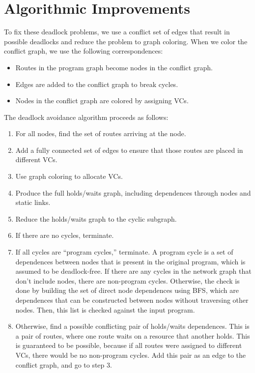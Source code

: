 \section{Algorithmic Improvements}
\label{sec:algo}
To fix these deadlock problems, we use a conflict set of edges that result in possible deadlocks and reduce the problem to graph coloring.
When we color the conflict graph, we use the following correspondences:
\begin{itemize}
  \item Routes in the program graph become nodes in the conflict graph.
  \item Edges are added to the conflict graph to break cycles.
  \item Nodes in the conflict graph are colored by assigning VCs.
\end{itemize}

The deadlock avoidance algorithm proceeds as follows:
\begin{enumerate}
  \item For all nodes, find the set of routes arriving at the node.
  \item Add a fully connected set of edges to ensure that those routes are placed in different VCs.
  \item Use graph coloring to allocate VCs.
  \item Produce the full holds/waits graph, including dependences through nodes and static links.
  \item Reduce the holds/waits graph to the cyclic subgraph.
  \item If there are no cycles, terminate.
  \item If all cycles are ``program cycles,'' terminate. A program cycle is a set of dependences between nodes that is present in the original program, which is assumed to be deadlock-free. 
        If there are any cycles in the network graph that don't include nodes, there are non-program cycles.
        Otherwise, the check is done by building the set of direct node dependences using BFS, which are dependences that can be constructed between nodes without traversing other nodes.
        Then, this list is checked against the input program. 
  \item Otherwise, find a possible conflicting pair of holds/waits dependences. This is a pair of routes, where one route waits on a resource that another holds. This is guaranteed to be possible, because if all routes were assigned to different VCs, there would be no non-program cycles. Add this pair as an edge to the conflict graph, and go to step 3.
\end{enumerate}
